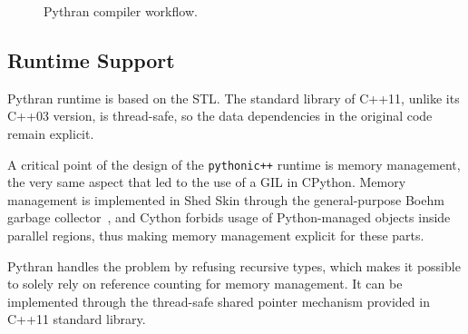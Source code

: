 \documentclass{llncs}
\begin{document}
\begin{figure}

\centering
{}
\caption{Pythran compiler workflow.}
\label{fig:pythran-compiler}
\end{figure}

\subsection{Runtime Support}

Pythran runtime is based on the STL. The standard library of C++11, unlike its
C++03 version, is thread-safe, so the data dependencies in the original code
remain explicit.

A critical point of the design of the \texttt{pythonic++} runtime is memory
management, the very same aspect that led to the use of a GIL in CPython.
Memory management is implemented in Shed Skin through the general-purpose Boehm
garbage collector~\cite{boehm1991}, and Cython forbids usage of Python-managed
objects inside parallel regions, thus making memory management explicit for
these parts.

Pythran handles the problem by refusing recursive types, which makes it possible
to solely rely on reference counting for memory management. It can be
implemented through the thread-safe shared pointer mechanism provided in C++11
standard library.
\end{document}
